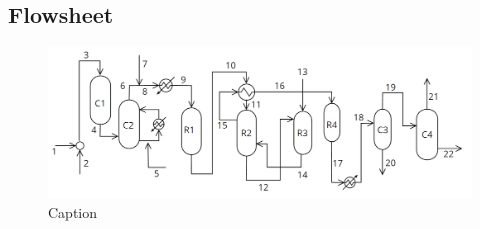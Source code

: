\subsection{Flowsheet}
\begin{figure}[ht!]
    \centering
    \includegraphics[width = \textwidth]{Figure/FinalFlowsheet.PNG}
    \caption{Caption}
    \label{fig:my_label}
\end{figure}